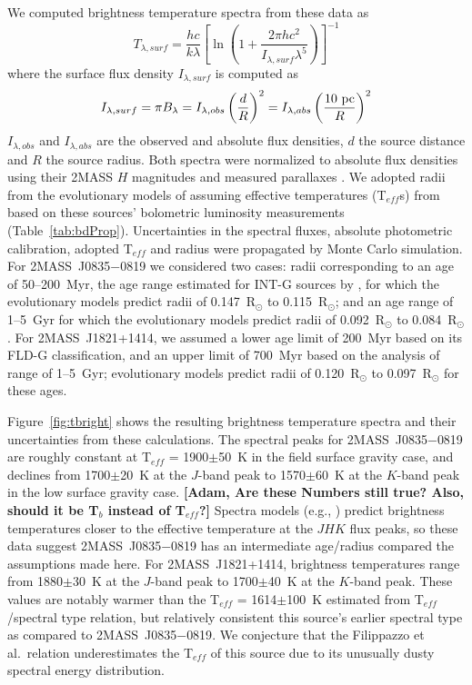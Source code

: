 \documentclass[twocolumn]{aastex6}
\newcommand{\teff}{T$_{eff}$}
\newcommand{\sha}{2MASS~J0835$-$0819}
\newcommand{\shb}{2MASS~J1821+1414}
\begin{document}
We computed brightness temperature spectra from these data as
\begin{equation}
T_{\lambda,surf} = \frac{hc}{k\lambda}\left[\ln\left(1+\frac{2\pi{hc^2}}{I_{\lambda,surf}\lambda^5}\right)\right]^{-1}
\end{equation}
where the surface flux density $I_{\lambda,surf}$ is computed as
\begin{equation}
I_{\lambda,surf} = {\pi}B_{\lambda} = I_{\lambda,obs}\left(\frac{d}{R}\right)^2 = I_{\lambda,abs}\left(\frac{10~{\rm pc}}{R}\right)^2
\end{equation}
$I_{\lambda,obs}$ and $I_{\lambda,abs}$ are the observed and absolute flux densities, $d$ the source distance and $R$ the source radius.  Both spectra were normalized to absolute flux densities using their 2MASS $H$ magnitudes and measured parallaxes \citep{2016MNRAS.455..357S,2016AJ....152...24W}. We adopted radii from the evolutionary models of \citet{2003A&A...402..701B} assuming effective temperatures ({\teff}s) from \citet{2015ApJ...810..158F} based on these sources' bolometric luminosity measurements (Table~\ref{tab:bdProp}). Uncertainties in the spectral fluxes, absolute photometric calibration, adopted {\teff} and radius were propagated by Monte Carlo simulation.  For {\sha} we considered two cases: radii corresponding to an age of 50--200~Myr, the age range estimated for INT-G sources by \citet{2013ApJ...772...79A}, for which the evolutionary models predict radii of 0.147~R$_{\odot}$ to 0.115~R$_{\odot}$; and an age range of 1--5~Gyr for which the evolutionary models predict radii of 0.092~R$_{\odot}$ to 0.084~R$_{\odot}$.
For {\shb}, we assumed a lower age limit of 200~Myr based on its FLD-G classification, and an upper limit of 700~Myr based on the analysis of \citet{2016MNRAS.455..357S} range of 1--5~Gyr; evolutionary models predict radii of 0.120~R$_{\odot}$ to 0.097~R$_{\odot}$ for these ages.  

Figure~\ref{fig:tbright} shows the resulting brightness temperature spectra and their uncertainties from these calculations.  The spectral peaks for {\sha} are roughly constant at {\teff} = 1900$\pm$50~K in the field surface gravity case, and declines from 1700$\pm$20~K at the $J$-band peak to 1570$\pm$60~K at the $K$-band peak in the low surface gravity case.
{\bf [Adam, Are these Numbers still true? Also, should it be T$_b$ instead of T$_{eff}$?]}
Spectra models (e.g., \citealt{2012RSPTA.370.2765A}) predict brightness temperatures closer to the effective temperature at the $JHK$ flux peaks, so these data suggest {\sha} has an intermediate age/radius compared the assumptions made here. For {\shb}, 
brightness temperatures range from 1880$\pm$30~K at the $J$-band peak to 1700$\pm$40~K at the $K$-band peak.
These values are notably warmer than the {\teff} = 1614$\pm$100~K estimated from \citet{2015ApJ...810..158F} {\teff}/spectral type relation, but relatively consistent this source's earlier spectral type as compared to {\sha}. We conjecture that the Filippazzo et al.\ relation underestimates the {\teff} of this source due to its unusually dusty spectral energy distribution.
\end{document}
